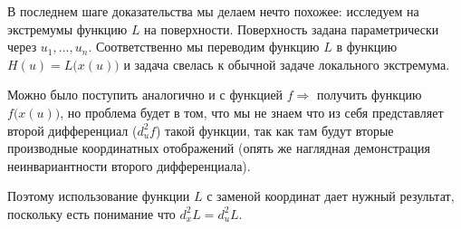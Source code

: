 \documentclass[12pt]{article}
\theoremstyle{definition}
\begin{document}
В последнем шаге доказательства мы делаем нечто похожее: исследуем на экстремумы функцию $L$ на поверхности. Поверхность задана параметрически через $u_1, \dotsc, u_n$. Соответственно мы переводим функцию $L$ в функцию $H(u) = L\big(x(u)\big)$ и задача свелась к обычной задаче локального экстремума. 

Можно было поступить аналогично и с функцией $f \Rightarrow$ получить функцию $f\big(x(u)\big)$, но проблема будет в том, что мы не знаем что из себя представляет второй дифференциал ($d_u^2 f$) такой функции, так как там будут вторые производные координатных отображений (опять же наглядная демонстрация неинвариантности второго дифференциала). 

Поэтому использование функции $L$ с заменой координат дает нужный результат, поскольку есть понимание что $d^2_x L = d^2_u L$.
\end{document}
